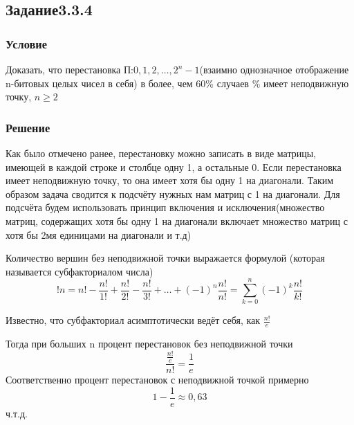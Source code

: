 \documentclass[10pt,a4paper]{article}
\begin{document}
\subsection*{Задание3.3.4}
\subsubsection*{Условие}
Доказать, что перестановка П:$ 0, 1, 2, … , 2^n-1 $(взаимно однозначное
отображение n-битовых целых чисел в себя) в более, чем 60\% случаев
\% имеет неподвижную точку, $ n \geq 2 $
\subsubsection*{Решение}
Как было отмечено ранее, перестановку можно записать в виде матрицы,
имеющей в каждой строке и столбце одну 1, а остальные 0.
Если перестановка имеет неподвижную точку, то она имеет хотя бы одну 1
на диагонали. Таким образом задача сводится к подсчёту нужных нам
матриц с 1 на диагонали.
Для подсчёта будем использовать принцип включения и
исключения(множество матриц, содержащих хотя бы одну 1 на диагонали
включает множество матриц с хотя бы 2мя единицами на диагонали и т.д)

Количество вершин без неподвижной точки выражается формулой (которая
называется субфакториалом числа)
$$ !n = n!-\frac{n!}{1!}+\frac{n!}{2!}-\frac{n!}{3!}+\dots
+(-1)^n\frac{n!}{n!} = \sum_{k=0}^n(-1)^k\frac{n!}{k!}  $$

Известно, что субфакториал асимптотически ведёт себя, как 
$ \frac{n!}{e} $

Тогда при больших n процент перестановок без неподвижной точки
$$ \frac{\frac{n!}{e}}{n!} = \frac{1}{e} $$
Соответственно процент перестановок с неподвижной точкой примерно
$$ 1 - \frac{1}{e} \approx 0,63 $$
ч.т.д.
\end{document}
